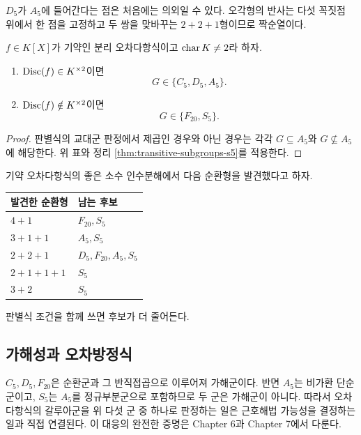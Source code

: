 $D_5$가 $A_5$에 들어간다는 점은 처음에는 의외일 수 있다. 오각형의 반사는 다섯 꼭짓점 위에서 한 점을 고정하고 두 쌍을 맞바꾸는 $2+2+1$형이므로 짝순열이다.

\begin{corollary}[판별식에 따른 첫 분기]
\label{cor:quintic-discriminant-first-split}
$f\in K[X]$가 기약인 분리 오차다항식이고 $\operatorname{char} K\ne2$라 하자.
\begin{enumerate}[label=(\roman*)]
  \item $\operatorname{Disc}(f)\in K^{\times2}$이면
  \[
    G\in\{C_5,D_5,A_5\}.
  \]
  \item $\operatorname{Disc}(f)\notin K^{\times2}$이면
  \[
    G\in\{F_{20},S_5\}.
  \]
\end{enumerate}
\end{corollary}

\begin{proof}
판별식의 교대군 판정에서 제곱인 경우와 아닌 경우는 각각 $G\subseteq A_5$와 $G\not\subseteq A_5$에 해당한다. 위 표와 정리 \ref{thm:transitive-subgroups-s5}를 적용한다.
\end{proof}

\begin{corollary}
기약 오차다항식의 좋은 소수 인수분해에서 다음 순환형을 발견했다고 하자.
\begin{center}
\begin{tabular}{ll}
\toprule
발견한 순환형 & 남는 후보 \\
\midrule
$4+1$ & $F_{20},S_5$ \\
$3+1+1$ & $A_5,S_5$ \\
$2+2+1$ & $D_5,F_{20},A_5,S_5$ \\
$2+1+1+1$ & $S_5$ \\
$3+2$ & $S_5$ \\
\bottomrule
\end{tabular}
\end{center}
판별식 조건을 함께 쓰면 후보가 더 줄어든다.
\end{corollary}

\subsection{가해성과 오차방정식}

$C_5,D_5,F_{20}$은 순환군과 그 반직접곱으로 이루어져 가해군이다. 반면 $A_5$는 비가환 단순군이고, $S_5$는 $A_5$를 정규부분군으로 포함하므로 두 군은 가해군이 아니다. 따라서 오차다항식의 갈루아군을 위 다섯 군 중 하나로 판정하는 일은 근호해법 가능성을 결정하는 일과 직접 연결된다. 이 대응의 완전한 증명은 Chapter 6과 Chapter 7에서 다룬다.

